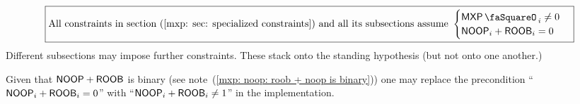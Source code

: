 \[
	\boxed{%
	\text{All constraints in section~(\ref{mxp: sec: specialized constraints}) and all its subsections assume }%
	\begin{cases}
		\mxpStamp_{i} \neq 0 \\
		\noop_{i} + \roob_{i} = 0 \\
	\end{cases}
	}
\]
Different subsections may impose further constraints. These stack onto the standing hypothesis (but not onto one another.) 

\saNote{} Given that $\textsf{NOOP} + \textsf{ROOB}$ is binary (see note~(\ref{mxp: noop: roob + noop is binary})) one may replace the precondition
``$\textsf{NOOP}_{i} + \textsf{ROOB}_{i} =    0$'' with
``$\textsf{NOOP}_{i} + \textsf{ROOB}_{i} \neq 1$'' in the implementation.
